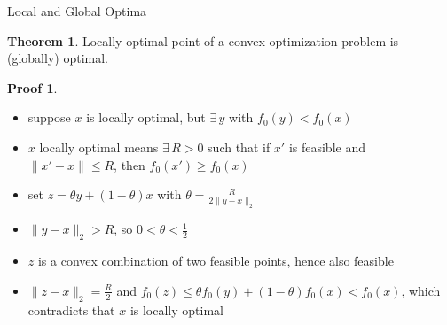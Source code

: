 \documentclass[10pt]{beamer}
\newcommand{\ds}{\displaystyle}
\theoremstyle{definition}
\newtheorem*{thm}{Theorem}
\newtheorem*{prf}{Proof}
\begin{document}
\begin{frame}{Local and Global Optima}
  \begin{thm}
    Locally optimal point of a convex optimization problem is (globally) optimal.
  \end{thm}
  \begin{prf}
    \begin{itemize}\setlength\itemsep{0em}
      \item suppose $x$ is locally optimal, but $\exists\,y$ with $f_0(y) < f_0(x)$
      \item $x$ locally optimal means $\exists\, R > 0$ such that if $x'$ is feasible and $\|x' - x\|\leqslant R$, then $f_0(x')\geqslant f_0(x)$ 
      \item set $\ds z = \theta y + (1 - \theta) x$ with $\ds\theta = \frac{R}{2\|y - x\|_2}$
      \item $\ds\|y - x\|_2 > R$, so $\ds 0 < \theta < \frac{1}{2}$
      \item $z$ is a convex combination of two feasible points, hence also feasible
      \item $\ds\|z - x\|_2 = \frac{R}{2}$ and $f_0(z)\leqslant\theta f_0(y) + (1 - \theta) f_0(x) < f_0(x)$, which contradicts that $x$ is locally optimal
    \end{itemize}
  \end{prf}
\end{frame}

%  
%  
\end{document}
